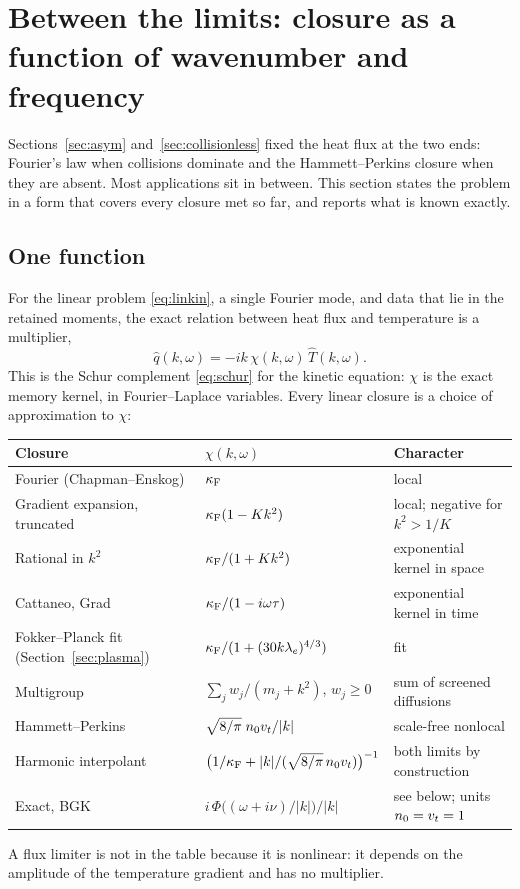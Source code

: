 \section{Between the limits: closure as a function of wavenumber and frequency}
\label{sec:between}

Sections~\ref{sec:asym} and~\ref{sec:collisionless} fixed the heat flux at
the two ends: Fourier's law when collisions dominate and the
Hammett--Perkins closure when they are absent. Most applications sit in
between. This section states the problem in a form that covers every
closure met so far, and reports what is known exactly.

\subsection{One function}

For the linear problem \eqref{eq:linkin}, a single Fourier mode, and data
that lie in the retained moments, the exact relation between heat flux and
temperature is a multiplier,
\begin{equation}
  \hat q(k,\omega)=-ik\,\chi(k,\omega)\,\hat T(k,\omega) .
  \label{eq:symbol}
\end{equation}
This is the Schur complement \eqref{eq:schur} for the kinetic equation:
$\chi$ is the exact memory kernel, in Fourier--Laplace variables. Every
linear closure is a choice of approximation to $\chi$:
\begin{center}
\renewcommand{\arraystretch}{1.35}
\begin{tabularx}{\textwidth}{@{}P{4.4cm}P{4.6cm}Y@{}}
\toprule
Closure & $\chi(k,\omega)$ & Character \\
\midrule
Fourier (Chapman--Enskog) & $\kappa_{\mathrm F}$ & local \\
Gradient expansion, truncated & $\kappa_{\mathrm F}(1-Kk^2)$
  & local; negative for $k^2>1/K$ \\
Rational in $k^2$ & $\kappa_{\mathrm F}/(1+Kk^2)$
  & exponential kernel in space \\
Cattaneo, Grad & $\kappa_{\mathrm F}/(1-i\omega\tau)$
  & exponential kernel in time \\
Fokker--Planck fit (Section~\ref{sec:plasma}) & $\kappa_{\mathrm F}/(1+(30k\lambda_e)^{4/3})$ & fit \\
Multigroup & $\sum_jw_j/(m_j+k^2)$, $w_j\ge0$
  & sum of screened diffusions \\
Hammett--Perkins & $\sqrt{8/\pi}\;n_0v_t/|k|$
  & scale-free nonlocal \\
Harmonic interpolant & $\bigl(1/\kappa_{\mathrm F}+|k|/(\sqrt{8/\pi}\,n_0v_t)\bigr)^{-1}$
  & both limits by construction \\
Exact, BGK & $i\,\Phi\bigl((\omega+i\nu)/|k|\bigr)/|k|$ & see below; units $n_0=v_t=1$ \\
\bottomrule
\end{tabularx}
\end{center}
A flux limiter is not in the table because it is nonlinear: it depends on
the amplitude of the temperature gradient and has no multiplier.

